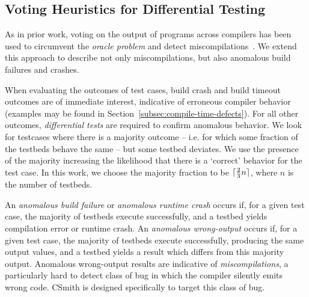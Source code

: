\subsection{Voting Heuristics for Differential Testing}

As in prior work, voting on the output of programs across compilers has been used to circumvent the \emph{oracle problem} and detect miscompilations~\cite{McKeeman1998}. We extend this approach to describe not only miscompilations, but also anomalous build failures and crashes.


%

When evaluating the outcomes of test cases, build crash and build timeout outcomes are of immediate interest, indicative of erroneous compiler behavior (examples may be found in Section~\ref{subsec:compile-time-defects}). For all other outcomes, \emph{differential tests} are required to confirm anomalous behavior. We look for testcases where there is a majority outcome -- i.e. for which some fraction of the testbeds behave the same -- but some testbed deviates. We use the presence of the majority increasing the likelihood that there is a `correct' behavior for the test case. In this work, we choose the majority fraction to be $\lceil\frac{2}{3}n\rceil$, where $n$ is the number of testbeds.

An \emph{anomalous build failure} or \emph{anomalous runtime crash} occurs if, for a given test case, the majority of testbeds execute successfully, and a testbed yields compilation error or runtime crash.
An \emph{anomalous wrong-output} occurs if, for a given test case, the majority of testbeds execute successfully, producing the same output values, and a testbed yields a result which differs from this majority output. Anomalous wrong-output results are indicative of \emph{miscompilations}, a particularly hard to detect class of bug in which the compiler silently emits wrong code. CSmith is designed specifically to target this class of bug.

